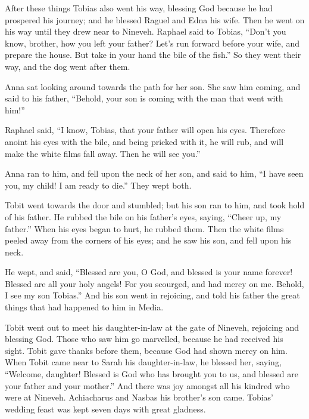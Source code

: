  After these things Tobias also went his way, blessing God
because he had prospered his journey; and he blessed Raguel and Edna his
wife. Then he went on his way until they drew near to Nineveh.
 Raphael said to Tobias, ``Don't you know, brother, how you
left your father?  Let's run forward before your wife, and
prepare the house.  But take in your hand the bile of the
fish.'' So they went their way, and the dog went after them.

 Anna sat looking around towards the path for her son.
 She saw him coming, and said to his father, ``Behold, your
son is coming with the man that went with him!''

 Raphael said, ``I know, Tobias, that your father will open
his eyes.  Therefore anoint his eyes with the bile, and
being pricked with it, he will rub, and will make the white films fall
away. Then he will see you.''

 Anna ran to him, and fell upon the neck of her son, and
said to him, ``I have seen you, my child! I am ready to die.'' They wept
both.

 Tobit went towards the door and stumbled; but his son ran
to him,  and took hold of his father. He rubbed the bile on
his father's eyes, saying, ``Cheer up, my father.''  When
his eyes began to hurt, he rubbed them.  Then the white
films peeled away from the corners of his eyes; and he saw his son, and
fell upon his neck.

 He wept, and said, ``Blessed are you, O God, and blessed
is your name forever! Blessed are all your holy angels! 
For you scourged, and had mercy on me. Behold, I see my son Tobias.''
And his son went in rejoicing, and told his father the great things that
had happened to him in Media.

 Tobit went out to meet his daughter-in-law at the gate of
Nineveh, rejoicing and blessing God. Those who saw him go marvelled,
because he had received his sight.  Tobit gave thanks
before them, because God had shown mercy on him. When Tobit came near to
Sarah his daughter-in-law, he blessed her, saying, ``Welcome, daughter!
Blessed is God who has brought you to us, and blessed are your father
and your mother.'' And there was joy amongst all his kindred who were at
Nineveh.  Achiacharus and Nasbas his brother's son came.
 Tobias' wedding feast was kept seven days with great
gladness.

